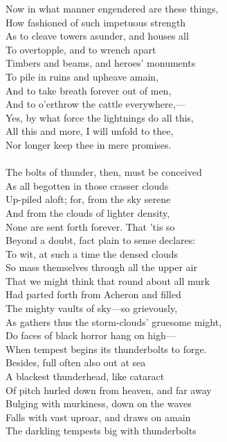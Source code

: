 Now in what manner engendered are these things,\\
How fashioned of such impetuous strength\\
As to cleave towers asunder, and houses all\\
To overtopple, and to wrench apart\\
Timbers and beams, and heroes' monuments\\
To pile in ruins and upheave amain,\\
And to take breath forever out of men,\\
And to o'erthrow the cattle everywhere,—\\
Yes, by what force the lightnings do all this,\\
All this and more, I will unfold to thee,\\
Nor longer keep thee in mere promises.\\
\\
The bolts of thunder, then, must be conceived\\
As all begotten in those crasser clouds\\
Up-piled aloft; for, from the sky serene\\
And from the clouds of lighter density,\\
None are sent forth forever. That 'tis so\\
Beyond a doubt, fact plain to sense declares:\\
To wit, at such a time the densed clouds\\
So mass themselves through all the upper air\\
That we might think that round about all murk\\
Had parted forth from Acheron and filled\\
The mighty vaults of sky—so grievously,\\
As gathers thus the storm-clouds' gruesome might,\\
Do faces of black horror hang on high—\\
When tempest begins its thunderbolts to forge.\\
Besides, full often also out at sea\\
A blackest thunderhead, like cataract\\
Of pitch hurled down from heaven, and far away\\
Bulging with murkiness, down on the waves\\
Falls with vast uproar, and draws on amain\\
The darkling tempests big with thunderbolts\\
